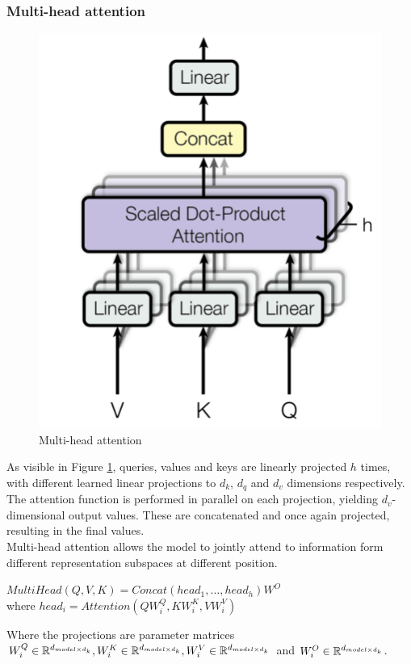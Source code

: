 \documentclass[\main/main.tex]{subfiles}
\begin{document}
\subsubsection{Multi-head attention}
\begin{figure}[H]
    \centering
    \includegraphics[scale=0.25]{images/transformer/multi-headed_attention.jpeg}
    \caption{Multi-head attention}
    \label{fig:multi-head_attention}
\end{figure}
As visible in Figure \ref{fig:multi-head_attention}, queries, values and keys are linearly projected $h$ times, with different learned linear projections to $d_k$, $d_q$ and $d_v$ dimensions respectively. The attention function is performed in parallel on each projection, yielding $d_v$-dimensional output values. These are concatenated and once again projected, resulting in the final values. \\
Multi-head attention allows the model to jointly attend to information form different representation subspaces at different position. 
\begin{center}
    $MultiHead(Q, V, K) = Concat(head_1, \dots, head_h)W^O$\\
    where $head_i = Attention(QW^Q_i, KW^K_i, VW^V_i)$
\end{center}
Where the projections are parameter matrices $W^Q_i\in\mathbb{R}^{d_{model \times d_k}}, W^K_i\in\mathbb{R}^{d_{model \times d_k}}, W^V_i\in\mathbb{R}^{d_{model \times d_k}}$ and $ W^O_i\in\mathbb{R}^{d_{model \times d_k}}$.
\end{document}
